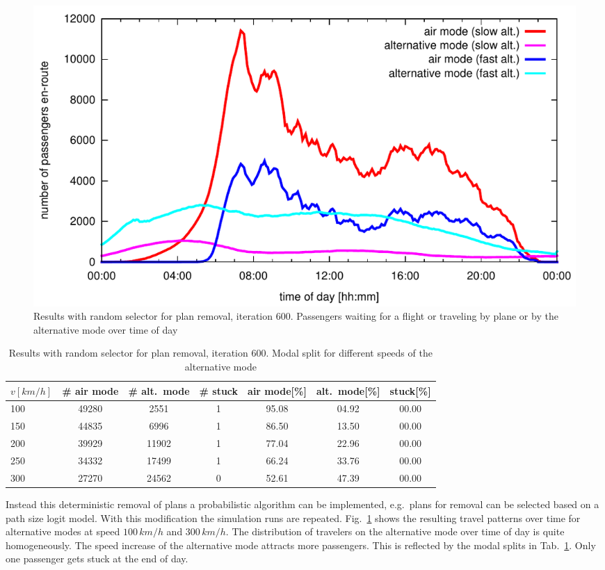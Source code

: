 \begin{figure}[t]
	\centering
	\includegraphics[width=\linewidth]{./extending/figures/air/leg_histogram_improved_flight_train_en_route_1893_1897_it_600.pdf}
	\caption{Results with random selector for plan removal, iteration 600. Passengers waiting for a flight or traveling by plane or by the alternative mode over time of day}
	\label{fig:2009_leg_histogram_modes_psl}
\end{figure}

\begin{table}[t]
	\centering
	\begin{tabular}{@{}l|ccc|ccc@{}}
		$v [km/h]$	& \# air mode  & \# alt.~mode & \# stuck & air mode[\%]  & alt.~mode[\%] & stuck[\%] \\
		\hline 
		100 & 49280 & 2551 & 1 & 95.08 & 04.92 & 00.00\\	%
		150 & 44835 & 6996 & 1 & 86.50 & 13.50 & 00.00\\	%
		200 & 39929 & 11902 & 1 & 77.04 & 22.96 & 00.00\\	%
		250 & 34332 & 17499 & 1 & 66.24 & 33.76 & 00.00\\	%
		300 & 27270 & 24562 & 0 & 52.61 & 47.39 & 00.00\\	%
	\end{tabular}
	\caption{Results with random selector for plan removal, iteration 600. Modal split for different speeds of the alternative mode}
	\label{tab:2009_results_train_modal_split_psl}
\end{table}


Instead this deterministic removal of plans a probabilistic algorithm can be implemented, e.g.~plans for removal can be selected based on a path size logit model. 
With this modification the simulation runs are repeated. 
Fig.~\ref{fig:2009_leg_histogram_modes_psl} shows the resulting travel patterns over time for alternative modes at speed $100 \, km/h$ and $300 \, km/h$.  
The distribution of travelers on the alternative mode over time of day is quite homogeneously. 
The speed increase of the alternative mode attracts more passengers. 
This is reflected by the modal splits in Tab.~\ref{tab:2009_results_train_modal_split_psl}. 
Only one passenger gets stuck at the end of day. 

